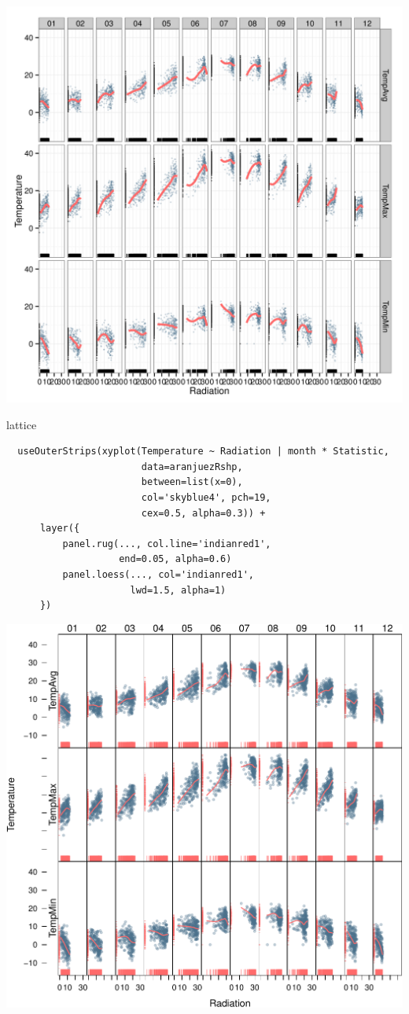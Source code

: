 \documentclass[xcolor={usenames,svgnames,dvipsnames}]{beamer}
\begin{document}
\begin{frame}[label=sec-4-2-2]{}
\includegraphics[width=.9\linewidth]{figs/aranjuezFacetGrid.png}
\end{frame}


\begin{frame}[fragile,label=sec-4-2-3]{lattice}
 \lstset{language=R,label= ,caption= ,numbers=none}
\begin{lstlisting}
  useOuterStrips(xyplot(Temperature ~ Radiation | month * Statistic,
                        data=aranjuezRshp,
                        between=list(x=0),
                        col='skyblue4', pch=19,
                        cex=0.5, alpha=0.3)) +
      layer({
          panel.rug(..., col.line='indianred1',
                    end=0.05, alpha=0.6)
          panel.loess(..., col='indianred1',
                      lwd=1.5, alpha=1)
      })
\end{lstlisting}
\end{frame}


\begin{frame}[label=sec-4-2-4]{}
\includegraphics[width=.9\linewidth]{figs/aranjuezOuterStrips.pdf}
\end{frame}


\begin{frame}[label=sec-4-2-5]{}

\end{frame}
\end{document}

